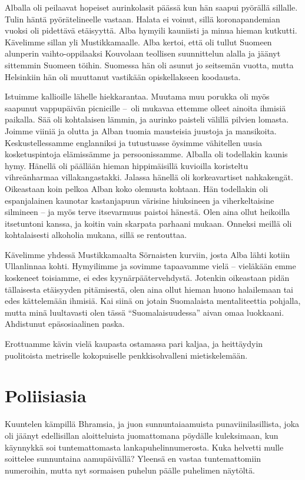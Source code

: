 \documentclass{tsnovel}
\begin{document}
Alballa oli peilaavat hopeiset aurinkolasit päässä kun hän saapui pyörällä sillalle. Tulin häntä pyörätelineelle vastaan. Halata ei voinut, sillä koronapandemian vuoksi oli pidettävä etäisyyttä. Alba hymyili kauniisti ja minua hieman kutkutti. Kävelimme sillan yli Mustikkamaalle. Alba kertoi, että oli tullut Suomeen alunperin vaihto-oppilaaksi Kouvolaan teollisen suunnittelun alalla ja jäänyt sittemmin Suomeen töihin. Suomessa hän oli asunut jo seitsemän vuotta, mutta Helsinkiin hän oli muuttanut vastikään opiskellakseen koodausta.

Istuimme kallioille lähelle hiekkarantaa. Muutama muu porukka oli myös saapunut vappupäivän picnicille – oli mukavaa ettemme olleet ainoita ihmisiä paikalla. Sää oli kohtalaisen lämmin, ja aurinko paisteli välillä pilvien lomasta. Joimme viiniä ja olutta ja Alban tuomia mausteisia juustoja ja mansikoita. Keskustellessamme englanniksi ja tutustuasse öysimme vähitellen uusia kosketuspintoja elämissämme ja persoonissamme. Alballa oli todellakin kaunis hymy. Hänellä oli päällään hieman hippimäisillä kuvioilla koristeltu vihreänharmaa villakangastakki. Jalassa hänellä oli korkeavartiset nahkakengät. Oikeastaan koin  pelkoa Alban koko olemusta kohtaan. Hän todellakin oli espanjalainen kaunotar kastanjapuun värisine hiuksineen ja viherkeltaisine silmineen – ja myös terve itsevarmuus paistoi hänestä. Olen aina ollut heikoilla itsetuntoni kanssa, ja koitin vain skarpata parhaani mukaan. Onneksi meillä oli kohtalaisesti alkoholia mukana, sillä se rentouttaa. 

Kävelimme yhdessä Mustikkamaalta Sörnaisten kurviin, josta Alba lähti kotiin Ullanlinnaa kohti. Hymyilimme ja sovimme tapaavamme vielä – vieläkään emme koskeneet toisiamme, ei edes kyynärpäätervehdystä. Jotenkin oikeastaan pidän tällaisesta etäisyyden pitämisestä, olen aina ollut hieman huono halailemaan tai edes kättelemään ihmisiä. Kai siinä on jotain Suomalaista mentaliteettia pohjalla, mutta minä luultavasti olen tässä ``Suomalaisuudessa'' aivan omaa luokkaani. Ahdistunut epäsosiaalinen paska.

Erottuamme kävin vielä kaupasta ostamassa pari kaljaa, ja heittäydyin puolitoista metriselle kokopuiselle penkkisohvalleni mietiskelemään.


\section{Poliisiasia}
Kuuntelen kämpillä Bhramsia, ja juon sunnuntaiaamuista punaviinilasillista, joka oli jäänyt edellisillan aloitteluista juomattomana pöydälle kuleksimaan, kun käynnykkä soi tuntemattomasta lankapuhelinnumerosta. Kuka helvetti mulle soittelee sunnuntaina aamupäivällä? Yleensä en vastaa tuntemattomiin numeroihin, mutta nyt sormaisen puhelun päälle puhelimen näytöltä.
\end{document}
